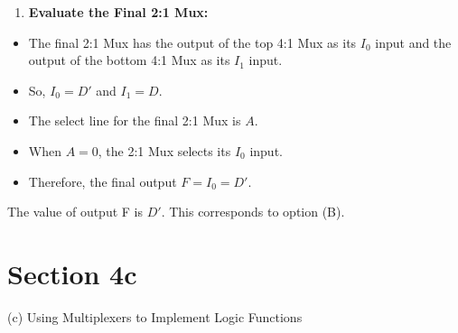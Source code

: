 \documentclass{article}
\begin{document}
\begin{enumerate}
\item \textbf{Evaluate the Final 2:1 Mux:}

\end{enumerate}
    \begin{itemize}
        \item The final 2:1 Mux has the output of the top 4:1 Mux as its $I_0$ input and the output of the bottom 4:1 Mux as its $I_1$ input.
        \item So, $I_0 = D'$ and $I_1 = D$.
        \item The select line for the final 2:1 Mux is $A$.
        \item When $A=0$, the 2:1 Mux selects its $I_0$ input.
        \item Therefore, the final output $F = I_0 = D'$.
    \end{itemize}

The value of output F is $D'$. This corresponds to option (B).

\section{Section 4c}

(c) Using Multiplexers to Implement Logic Functions
\end{document}
